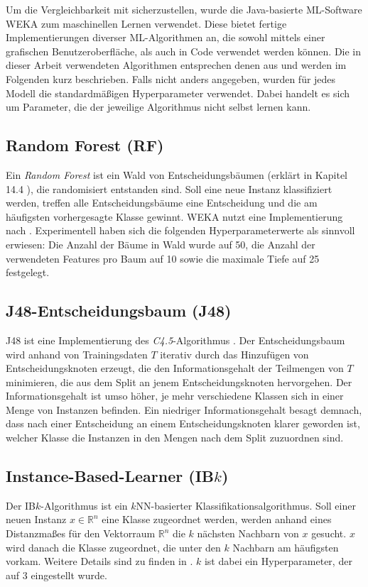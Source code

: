 Um die Vergleichbarkeit mit \cite{Weiss2016} sicherzustellen, wurde die Java-basierte ML-Software WEKA zum maschinellen Lernen verwendet. Diese bietet fertige Implementierungen diverser ML-Algorithmen an, die sowohl mittels einer grafischen Benutzeroberfläche, als auch in Code verwendet werden können. Die in dieser Arbeit verwendeten Algorithmen entsprechen denen aus \cite{Weiss2016} und werden im Folgenden kurz beschrieben. Falls nicht anders angegeben, wurden für jedes Modell die standardmäßigen Hyperparameter verwendet. Dabei handelt es sich um Parameter, die der jeweilige Algorithmus nicht selbst lernen kann.
\subsection{Random Forest (RF)}
Ein \textit{Random Forest} ist ein Wald von Entscheidungsbäumen (erklärt in Kapitel 14.4 \cite{Bishop2006}), die randomisiert entstanden sind. Soll eine neue Instanz klassifiziert werden, treffen alle Entscheidungsbäume eine Entscheidung und die am häufigsten vorhergesagte Klasse gewinnt. WEKA nutzt eine Implementierung nach \cite{Breiman2001}. Experimentell haben sich die folgenden Hyperparameterwerte als sinnvoll erwiesen: Die Anzahl der Bäume in Wald wurde auf 50, die Anzahl der verwendeten Features pro Baum auf 10 sowie die maximale Tiefe auf 25 festgelegt.
\subsection{J48-Entscheidungsbaum (J48)}
J48 ist eine Implementierung des \textit{C4.5}-Algorithmus \cite{Quinlan1993}. Der Entscheidungsbaum wird anhand von Trainingsdaten $T$ iterativ durch das Hinzufügen von Entscheidungsknoten erzeugt, die den Informationsgehalt der Teilmengen von $T$ minimieren, die aus dem Split an jenem Entscheidungsknoten hervorgehen. Der Informationsgehalt ist umso höher, je mehr verschiedene Klassen sich in einer Menge von Instanzen befinden. Ein niedriger Informationsgehalt besagt demnach, dass nach einer Entscheidung an einem Entscheidungsknoten klarer geworden ist, welcher Klasse die Instanzen in den Mengen nach dem Split zuzuordnen sind.
\subsection{Instance-Based-Learner (IB$k$)}
Der IB$k$-Algorithmus ist ein $k$NN-basierter Klassifikationsalgorithmus. Soll einer neuen Instanz $x \in \mathbb{R}^n$ eine Klasse zugeordnet werden, werden anhand eines Distanzmaßes für den Vektorraum $\mathbb{R}^n$ die $k$ nächsten Nachbarn von $x$ gesucht. $x$ wird danach die Klasse zugeordnet, die unter den $k$ Nachbarn am häufigsten vorkam. Weitere Details sind zu finden in \cite{Aha1991}.
$k$ ist dabei ein Hyperparameter, der auf 3 eingestellt wurde.
